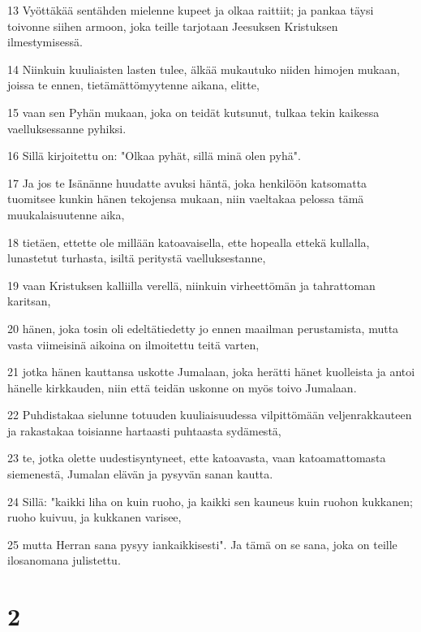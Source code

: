 \par 13 Vyöttäkää sentähden mielenne kupeet ja olkaa raittiit; ja pankaa täysi toivonne siihen armoon, joka teille tarjotaan Jeesuksen Kristuksen ilmestymisessä.
\par 14 Niinkuin kuuliaisten lasten tulee, älkää mukautuko niiden himojen mukaan, joissa te ennen, tietämättömyytenne aikana, elitte,
\par 15 vaan sen Pyhän mukaan, joka on teidät kutsunut, tulkaa tekin kaikessa vaelluksessanne pyhiksi.
\par 16 Sillä kirjoitettu on: "Olkaa pyhät, sillä minä olen pyhä".
\par 17 Ja jos te Isänänne huudatte avuksi häntä, joka henkilöön katsomatta tuomitsee kunkin hänen tekojensa mukaan, niin vaeltakaa pelossa tämä muukalaisuutenne aika,
\par 18 tietäen, ettette ole millään katoavaisella, ette hopealla ettekä kullalla, lunastetut turhasta, isiltä peritystä vaelluksestanne,
\par 19 vaan Kristuksen kalliilla verellä, niinkuin virheettömän ja tahrattoman karitsan,
\par 20 hänen, joka tosin oli edeltätiedetty jo ennen maailman perustamista, mutta vasta viimeisinä aikoina on ilmoitettu teitä varten,
\par 21 jotka hänen kauttansa uskotte Jumalaan, joka herätti hänet kuolleista ja antoi hänelle kirkkauden, niin että teidän uskonne on myös toivo Jumalaan.
\par 22 Puhdistakaa sielunne totuuden kuuliaisuudessa vilpittömään veljenrakkauteen ja rakastakaa toisianne hartaasti puhtaasta sydämestä,
\par 23 te, jotka olette uudestisyntyneet, ette katoavasta, vaan katoamattomasta siemenestä, Jumalan elävän ja pysyvän sanan kautta.
\par 24 Sillä: "kaikki liha on kuin ruoho, ja kaikki sen kauneus kuin ruohon kukkanen; ruoho kuivuu, ja kukkanen varisee,
\par 25 mutta Herran sana pysyy iankaikkisesti". Ja tämä on se sana, joka on teille ilosanomana julistettu.

\chapter{2}

